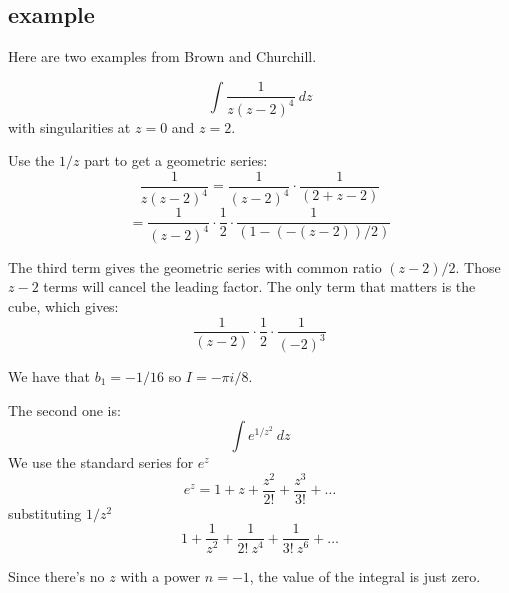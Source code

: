 \documentclass[11pt, oneside]{article}
\begin{document}
\subsection*{example}

Here are two examples from Brown and Churchill.

\[ \int \frac{1}{z(z-2)^4} \ dz \]
with singularities at $z = 0$ and $z = 2$.

Use the $1/z$ part to get a geometric series:
\[ \frac{1}{z(z-2)^4} = \frac{1}{(z-2)^4} \cdot \frac{1}{(2 + z - 2)} \]
\[ = \frac{1}{(z-2)^4} \cdot \frac{1}{2} \cdot \frac{1}{(1 - (-(z-2))/2 )} \]

The third term gives the geometric series with common ratio $(z-2)/2$.  Those $z-2$ terms will cancel the leading factor.  The only term that matters is the cube, which gives:
\[  \frac{1}{(z-2)} \cdot \frac{1}{2} \cdot \frac{1}{(-2)^3} \]

We have that $b_1 = -1/16$ so $I = -\pi i/8$.

The second one is:
\[ \int e^{1/z^2} \ dz \]
We use the standard series for $e^z$
\[ e^z = 1 + z + \frac{z^2}{2!} + \frac{z^3}{3!} + \dots \]
substituting $1/z^2$
\[ 1 + \frac{1}{z^2} + \frac{1}{2! \ z^4} + \frac{1}{3! \ z^6} + \dots \]

Since there's no $z$ with a power $n=-1$, the value of the integral is just zero.
\end{document}
